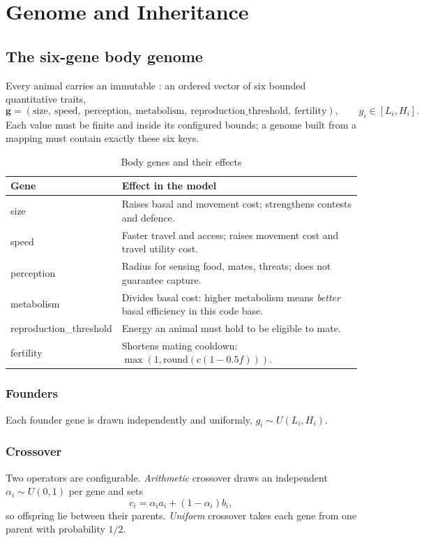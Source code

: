 \chapter{Genome and Inheritance}

\section{The six-gene body genome}
Every animal carries an immutable : an ordered vector of six bounded
quantitative traits,
\[
\mathbf{g}=(\text{size},\ \text{speed},\ \text{perception},\ \text{metabolism},\ \text{reproduction\_threshold},\ \text{fertility}),
\qquad g_i\in[L_i,H_i].
\]
Each value must be finite and inside its configured bounds; a genome built from a
mapping must contain exactly these six keys.

\begin{table}[htbp]
\centering
\caption{Body genes and their effects}
\begin{tabularx}{\textwidth}{lL}
\toprule
Gene & Effect in the model \\
\midrule
size & Raises basal and movement cost; strengthens contests and defence. \\
speed & Faster travel and access; raises movement cost and travel utility cost. \\
perception & Radius for sensing food, mates, threats; does not guarantee capture. \\
metabolism & Divides basal cost: higher metabolism means \emph{better} basal efficiency in this code base. \\
reproduction\_threshold & Energy an animal must hold to be eligible to mate. \\
fertility & Shortens mating cooldown: $\max(1,\mathrm{round}(c(1-0.5f)))$. \\
\bottomrule
\end{tabularx}
\end{table}

\subsection{Founders}
Each founder gene is drawn independently and uniformly, $g_i\sim U(L_i,H_i)$.

\subsection{Crossover}
Two operators are configurable. \emph{Arithmetic} crossover draws an independent
$\alpha_i\sim U(0,1)$ per gene and sets
\[
c_i=\alpha_i a_i+(1-\alpha_i)b_i,
\]
so offspring lie between their parents. \emph{Uniform} crossover takes each gene
from one parent with probability $1/2$.


